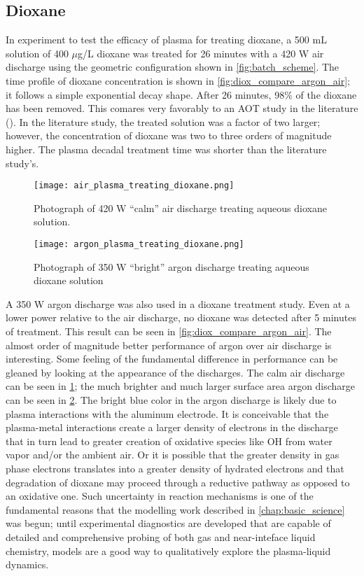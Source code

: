 \subsection{Dioxane}
\label{sec:dioxane}

In experiment to test the efficacy of plasma for treating dioxane, a 500 mL solution of 400 $\mu$g/L dioxane was treated for 26 minutes with a 420 W air discharge using the geometric configuration shown in \cref{fig:batch_scheme}. The time profile of dioxane concentration is shown in \cref{fig:diox_compare_argon_air}; it follows a simple exponential decay shape. After 26 minutes, 98\% of the dioxane has been removed. This comares very favorably to an AOT study in the literature (\cite{suh2004study}). In the literature study, the treated solution was a factor of two larger; however, the concentration of dioxane was two to three orders of magnitude higher. The plasma decadal treatment time was shorter than the literature study's.

\begin{figure}[htbp]
  \centering
  \texttt{[image: air\_plasma\_treating\_dioxane.png]}
  \caption{Photograph of 420 W ``calm'' air discharge treating aqueous dioxane solution.}
  \label{fig:diox_air}
\end{figure}

\begin{figure}[htbp]
  \centering
  \texttt{[image: argon\_plasma\_treating\_dioxane.png]}
  \caption{Photograph of 350 W ``bright'' argon discharge treating aqueous dioxane solution}
  \label{fig:diox_argon}
\end{figure}

A 350 W argon discharge was also used in a dioxane treatment study. Even at a lower power relative to the air discharge, no dioxane was detected after 5 minutes of treatment. This result can be seen in \cref{fig:diox_compare_argon_air}. The almost order of magnitude better performance of argon over air discharge is interesting. Some feeling of the fundamental difference in performance can be gleaned by looking at the appearance of the discharges. The calm air discharge can be seen in \cref{fig:diox_air}; the much brighter and much larger surface area argon discharge can be seen in \cref{fig:diox_argon}. The bright blue color in the argon discharge is likely due to plasma interactions with the aluminum electrode. It is conceivable that the plasma-metal interactions create a larger density of electrons in the discharge that in turn lead to greater creation of oxidative species like OH from water vapor and/or the ambient air. Or it is possible that the greater density in gas phase electrons translates into a greater density of hydrated electrons and that degradation of dioxane may proceed through a reductive pathway as opposed to an oxidative one. Such uncertainty in reaction mechanisms is one of the fundamental reasons that the modelling work described in \cref{chap:basic_science} was begun; until experimental diagnostics are developed that are capable of detailed and comprehensive probing of both gas and near-inteface liquid chemistry, models are a good way to qualitatively explore the plasma-liquid dynamics.

